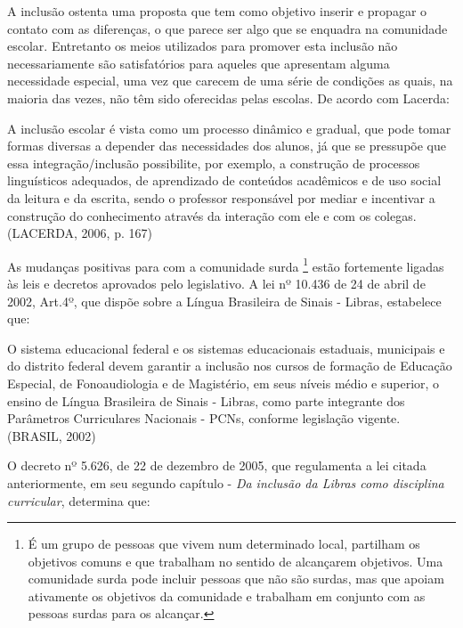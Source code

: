 \documentclass[brasil]{abnt}
\begin{document}
	A inclusão ostenta uma proposta que tem como objetivo inserir e propagar o contato com as diferenças, o que parece ser algo que se enquadra na comunidade escolar. Entretanto os meios utilizados
	para promover esta inclusão não necessariamente são satisfatórios para aqueles que apresentam alguma necessidade especial, uma vez que carecem de uma série de condições as quais, na maioria das vezes, 
	não têm sido oferecidas pelas escolas. De acordo com Lacerda:
		
			\begin{citacao}A inclusão escolar é vista como um processo dinâmico e gradual, que pode tomar formas diversas a depender das necessidades dos alunos, já que se pressupõe que essa integração/inclusão 
							possibilite, por exemplo, a construção de processos linguísticos adequados, de aprendizado de conteúdos acadêmicos e de uso social da leitura e da escrita, sendo o professor 
							responsável por mediar e incentivar a construção do conhecimento através da interação com ele e com os colegas. (LACERDA, 2006, p. 167)
			\end{citacao}
			
	As mudanças positivas para com a comunidade surda \footnote{É um grupo de pessoas que vivem num determinado local, partilham os objetivos comuns e que trabalham no sentido de alcançarem objetivos. 
	Uma comunidade surda pode incluir pessoas que não são surdas, mas que apoiam ativamente os objetivos da comunidade e trabalham em conjunto com as pessoas surdas para os alcançar.} estão fortemente ligadas 
	às leis e decretos aprovados pelo legislativo. A lei nº 10.436 de 24 de abril de 2002, Art.4º, que dispõe sobre a Língua Brasileira de Sinais - Libras, estabelece que:
		
			\begin{citacao} O sistema educacional federal e os sistemas educacionais estaduais, municipais e do distrito federal devem garantir a inclusão nos cursos de formação de Educação Especial, de 
							Fonoaudiologia e de Magistério, em seus níveis médio e superior, o ensino de Língua Brasileira de Sinais - Libras, como parte integrante dos Parâmetros Curriculares Nacionais - 
							PCNs, conforme legislação vigente. 
							(BRASIL, 2002)
			\end{citacao}
		
	O decreto nº 5.626, de 22 de dezembro de 2005, que regulamenta a lei citada anteriormente, em seu segundo capítulo - \textit{Da inclusão da Libras como disciplina curricular}, determina que:
		
\end{document}

